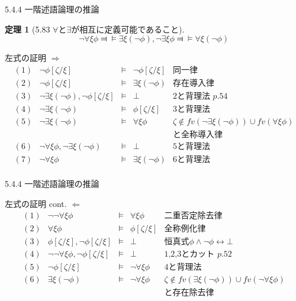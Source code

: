 \documentclass[dvipdfmx,11pt]{beamer}
\newtheorem{theo}[theorem]{定理}
\begin{document}
\begin{frame}{5.4.4 一階述語論理の推論}
  \begin{theo}[5.83 \(\forall\)と\(\exists\)が相互に定義可能であること]
    \[
    \neg\forall\xi\phi \Dashv\vDash \exists\xi(\neg\phi),
    \neg\exists\xi\phi \Dashv\vDash \forall\xi(\neg\phi)
    \]
  \end{theo}
  \begin{block}{左式の証明}
    \(\Rightarrow\)
    \[
    \begin{array}{rrcll}
      (1) & \neg\phi[\zeta/\xi] & \vDash & \neg\phi[\zeta/\xi] & \textit{同一律} \\
      (2) & \neg\phi[\zeta/\xi] & \vDash & \exists\xi(\neg\phi) & \textit{存在導入律} \\
      (3) & \neg\exists\xi(\neg\phi), \neg\phi[\zeta/\xi] & \vDash & \bot & \textit{2と背理法 p.54} \\
      (4) & \neg\exists\xi(\neg\phi) & \vDash & \phi[\zeta/\xi] & \textit{3と背理法} \\
      (5) & \neg\exists\xi(\neg\phi) & \vDash & \forall\xi\phi & \zeta\not\in\textit{fv}(\neg\exists\xi(\neg\phi))\cup\textit{fv}(\forall\xi\phi) \\
      & & & & \textit{と全称導入律} \\
      (6) & \neg \forall \xi \phi, \neg\exists\xi(\neg\phi) & \vDash & \bot & \textit{5と背理法} \\
      (7) & \neg \forall \xi \phi & \vDash & \exists \xi (\neg \phi) & \textit{6と背理法} \\
    \end{array}
    \]
  \end{block}
\end{frame}

\begin{frame}{5.4.4 一階述語論理の推論}
  \begin{block}{左式の証明 cont.}
    \(\Leftarrow\)
    \[
    \begin{array}{rrcll}
      (1) & \neg\neg\forall\xi\phi & \vDash & \forall\xi\phi & \textit{二重否定除去律} \\
      (2) & \forall\xi\phi & \vDash & \phi[\zeta/\xi] & \textit{全称例化律} \\
      (3) & \phi[\zeta/\xi],\neg\phi[\zeta/\xi] & \vDash & \bot & \textit{恒真式}\phi\wedge\neg\phi\leftrightarrow\bot \\
      (4) & \neg\neg\forall\xi\phi,\neg\phi[\zeta/\xi] & \vDash & \bot & \textit{1,2,3とカット p.52}\\
      (5) & \neg\phi[\zeta/\xi] & \vDash & \neg\forall\xi\phi & \textit{4と背理法} \\
      (6) & \exists\xi(\neg\phi) & \vDash & \neg\forall\xi\phi & \zeta\not\in\textit{fv}(\exists\xi(\neg\phi))\cup\textit{fv}(\neg\forall\xi\phi) \\
      & & & & \textit{と存在除去律} \\
    \end{array}
    \]
  \end{block}
\end{frame}
\end{document}
